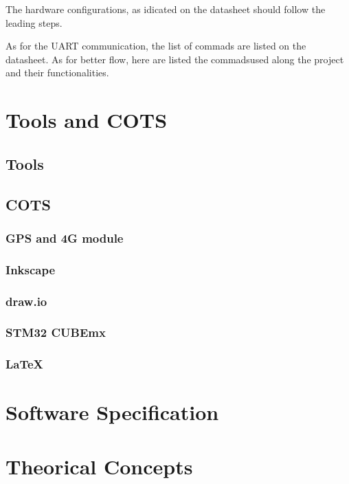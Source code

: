 The hardware configurations, as idicated on the datasheet should follow the leading steps.

As for the UART communication, the list of commads are listed on the datasheet. 
As for better flow, here are listed the commadsused along the project and their functionalities. 
\section{Tools and COTS}
\subsection{Tools}
\subsection{COTS}
\subsubsection{GPS and 4G module}
\subsubsection{Inkscape}
\subsubsection{draw.io}
\subsubsection{STM32 CUBEmx}
\subsubsection{\LaTeX}
\section{Software Specification}
\section{Theorical Concepts}